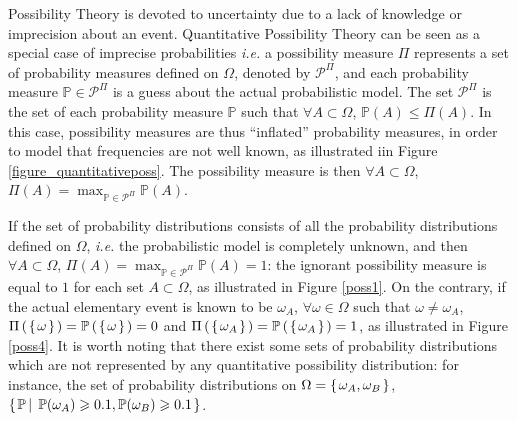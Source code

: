 Possibility Theory is devoted to uncertainty due to a lack of knowledge
or imprecision about an event.
Quantitative Possibility Theory can be seen as a special case of imprecise probabilities
\textit{i.e.} a possibility measure $\Pi$ represents a set of probability measures defined on $\Omega$,
denoted by $\mathcal{P}^{\Pi}$, and
each probability measure $\mathbb{P} \in \mathcal{P}^{\Pi}$ 
is a guess about the actual probabilistic model. 
The set $\mathcal{P}^{\Pi}$
is the set of each probability measure $\mathbb{P}$
such that $\forall A \subset \Omega$, $\mathbb{P}(A) \leqslant \Pi(A)$.
In this case, possibility measures are thus ``inflated'' probability measures,
in order to model that frequencies are not well known,
as illustrated iin Figure \ref{figure_quantitativeposs}.
The possibility measure is then $\forall A \subset \Omega$, $\Pi(A) = \max_{\mathbb{P} \in \mathcal{P}^{\Pi}} \mathbb{P}(A)$.

If the set of probability distributions consists of 
all the probability distributions defined on $\Omega$,
\textit{i.e.} the probabilistic model is completely unknown,
and then $\forall A \subset \Omega$,
$\Pi(A) = \max_{\mathbb{P} \in \mathcal{P}^{\Pi}} \mathbb{P}(A) = 1$:
the ignorant possibility measure is equal to $1$ for each set $A \subset \Omega$,
as illustrated in Figure \ref{poss1}.
On the contrary, if the actual elementary event is known to be $\omega_A$,
$\forall \omega \in \Omega$ such that $\omega \neq \omega_A$, $\Pi \left( \left.  \left\{ \left. \omega \right. \right\}  \right. \right) = \mathbb{P} \left( \left.  \left\{ \left. \omega \right. \right\}  \right. \right) = 0$
and  $\Pi \left( \left.  \left\{ \left. \omega_A \right. \right\}  \right. \right) = \mathbb{P} \left( \left.  \left\{ \left. \omega_A \right. \right\}  \right. \right) = 1$,
as illustrated in Figure \ref{poss4}.
It is worth noting that there exist some sets of probability distributions
which are not represented by any quantitative possibility distribution:
for instance, the set of probability distributions on $\Omega = \left\{ \left. \omega_A,\omega_B \right. \right\}$,
$\left\{ \left.  \mathbb{P} \, \right| \left. \, \mathbb{P}(\omega_A) \geqslant 0.1, \mathbb{P}(\omega_B) \geqslant 0.1   \right. \right\}$.

